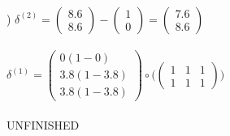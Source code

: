 \documentclass[12pt]{article}
\begin{document}
\noindent \hrulefill \\



) $\delta^{(2)} = 
\begin{pmatrix}
8.6 \\ 8.6
\end{pmatrix} - 
\begin{pmatrix}
1 \\ 0
\end{pmatrix} = 
\begin{pmatrix}
7.6 \\ 8.6
\end{pmatrix}$\\\\

\indent $\delta^{(1)} = 
\begin{pmatrix}
0(1 - 0) \\ 3.8(1 - 3.8) \\ 3.8(1 - 3.8)
\end{pmatrix} \circ \Bigg(
\begin{pmatrix}
1 & 1 & 1\\
1 & 1 & 1
\end{pmatrix} \Bigg)
$\\\\UNFINISHED




\noindent \hrulefill \\\pagebreak




\end{document}
